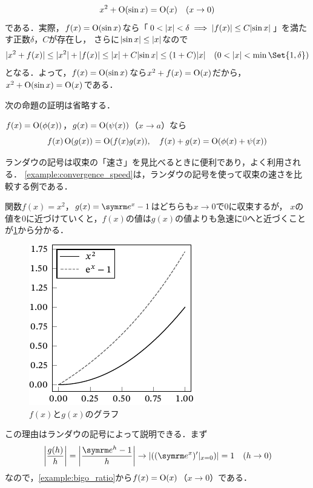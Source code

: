 \documentclass[../../main]{subfiles}
\begin{document}
\begin{example}
\[
  x^2+\operatorname{O}(\sin x) = \operatorname{O}(x)\quad(x\to 0)
\]
である．実際，\(f(x)=\operatorname{O}(\sin x)\)なら「\(0<\lvert x\rvert<\delta\implies\lvert f(x)\rvert\leq C\lvert\sin x\rvert\)」を満たす正数\(\delta\)，\(C\)が存在し，
さらに\(\lvert\sin x\rvert\leq\lvert x\rvert\)なので
\[
  \abs{x^2+f(x)} \leq \abs{x^2}+\abs{f(x)}
  \leq \abs{x}+C\abs{\sin x}
  \leq (1+C)\abs{x}\quad(0<\abs{x}<\min\Set{1,\delta})
\]
となる．よって，\(f(x)=\operatorname{O}(\sin x)\)なら\(x^2+f(x)=\operatorname{O}(x)\)だから，\(x^2+\operatorname{O}(\sin x)=\operatorname{O}(x)\)である．
\end{example}

次の命題の証明は省略する．

\begin{proposition}{}{}
\(f(x)=\operatorname{O}(\phi(x))\)，\(g(x)=\operatorname{O}(\psi(x))\)（\(x\to a\)）なら
\[
  f(x)\operatorname{O}(g(x)) = \operatorname{O}(f(x)g(x)),
  \quad f(x)+g(x) = \operatorname{O}(\phi(x)+\psi(x))
\]
\end{proposition}

ランダウの記号は収束の「速さ」を見比べるときに便利であり，よく利用される．
\cref{example:convergence_speed}は，ランダウの記号を使って収束の速さを比較する例である．

\begin{example}
\label{example:convergence_speed}
関数\(f(x)=x^2\)，\(g(x)=\napr^x-1\)はどちらも\(x\to 0\)で\(0\)に収束するが，
\(x\)の値を\(0\)に近づけていくと，\(f(x)\)の値は\(g(x)\)の値よりも急速に\(0\)へと近づくことが\cref{figure:speed}から分かる．

\begin{figure}[htbp]
  \centering
  \includegraphics{speed.pdf}
  \caption{\(f(x)\)と\(g(x)\)のグラフ}
  \label{figure:speed}
\end{figure}

この理由はランダウの記号によって説明できる．まず
\[
  \abs*{\frac{g(h)}{h}} = \abs*{\frac{\napr^h-1}{h}}
  \to \abs{(\eval{(\napr^x)'}_{x=0})}
  = 1\quad(h\to 0)
\]
なので，\cref{example:bigo_ratio}から\(f(x)=\operatorname{O}(x)\)（\(x\to 0\)）である．
\end{example}
\end{document}
